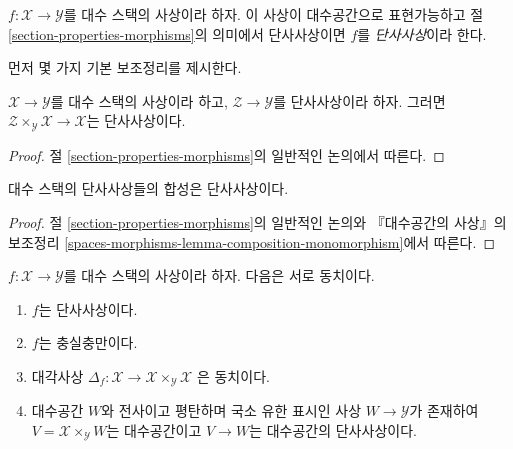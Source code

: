 \begin{definition}
\label{definition-monomorphism}
$f : \mathcal{X} \to \mathcal{Y}$를 대수 스택의 사상이라 하자.
이 사상이 대수공간으로 표현가능하고 절
\ref{section-properties-morphisms}의 의미에서 단사사상이면
$f$를 {\it 단사사상}이라 한다.
\end{definition}

\noindent
먼저 몇 가지 기본 보조정리를 제시한다.

\begin{lemma}
\label{lemma-base-change-monomorphism}
$\mathcal{X} \to \mathcal{Y}$를 대수 스택의 사상이라 하고,
$\mathcal{Z} \to \mathcal{Y}$를 단사사상이라 하자.
그러면 $\mathcal{Z} \times_\mathcal{Y} \mathcal{X} \to \mathcal{X}$는
단사사상이다.
\end{lemma}

\begin{proof}
절 \ref{section-properties-morphisms}의 일반적인 논의에서 따른다.
\end{proof}

\begin{lemma}
\label{lemma-composition-monomorphism}
대수 스택의 단사사상들의 합성은 단사사상이다.
\end{lemma}

\begin{proof}
절 \ref{section-properties-morphisms}의 일반적인 논의와
『대수공간의 사상』의 보조정리
\ref{spaces-morphisms-lemma-composition-monomorphism}에서 따른다.
\end{proof}

\begin{lemma}
\label{lemma-monomorphism}
$f : \mathcal{X} \to \mathcal{Y}$를 대수 스택의 사상이라 하자.
다음은 서로 동치이다.
\begin{enumerate}
\item $f$는 단사사상이다.
\item $f$는 충실충만이다.
\item 대각사상
$\Delta_f : \mathcal{X} \to \mathcal{X} \times_\mathcal{Y} \mathcal{X}$
은 동치이다.
\item 대수공간 $W$와 전사이고 평탄하며 국소 유한 표시인 사상
$W \to \mathcal{Y}$가 존재하여
$V = \mathcal{X} \times_\mathcal{Y} W$는 대수공간이고
$V \to W$는 대수공간의 단사사상이다.
\end{enumerate}
\end{lemma}

